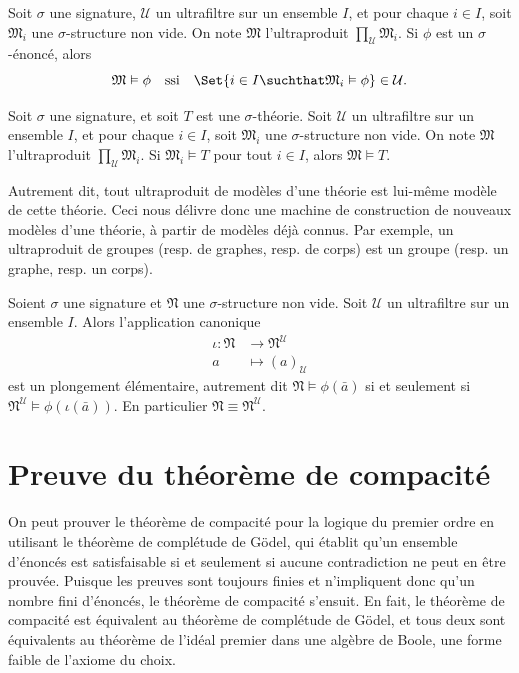 \begin{corollary}\label{cor.Los-enonce}
	Soit $\sigma$ une signature, $\mathcal{U}$ un ultrafiltre sur un ensemble $I$, et pour chaque $i\in I$, soit $\mathfrak{M}_{i}$ une $\sigma$-structure non vide. On note $\mathfrak{M}$ l'ultraproduit $\prod_{\mathcal{U}}\mathfrak{M}_{i}$. Si $\phi$ est un $\sigma$-énoncé, alors
	\[
		\mathfrak{M}\vDash\phi\quad\text{ssi}\quad\Set{i\in I\suchthat\mathfrak{M}_{i}\vDash\phi}\in\mathcal{U}.
	\]
\end{corollary}

\begin{corollary}
	Soit $\sigma$ une signature, et soit $T$ est une $\sigma$-théorie. Soit $\mathcal{U}$ un ultrafiltre sur un ensemble $I$, et pour chaque $i\in I$, soit $\mathfrak{M}_{i}$ une $\sigma$-structure non vide. On note $\mathfrak{M}$ l'ultraproduit $\prod_{\mathcal{U}}\mathfrak{M}_{i}$. Si $\mathfrak{M}_{i}\vDash T$ pour tout $i\in I$, alors $\mathfrak{M}\vDash T$.
\end{corollary}

Autrement dit, tout ultraproduit de modèles d'une théorie est lui-même modèle de cette théorie. Ceci nous délivre donc une machine de construction de nouveaux modèles d'une théorie, à partir de modèles déjà connus. Par exemple, un ultraproduit de groupes (resp. de graphes, resp. de corps) est un groupe (resp. un graphe, resp. un corps).

\begin{corollary}
	Soient $\sigma$ une signature et $\mathfrak{N}$ une $\sigma$-structure non vide. Soit $\mathcal{U}$ un ultrafiltre sur un ensemble $I$. Alors l'application canonique
	\begin{align*}
		\iota\colon\mathfrak{N}&\longrightarrow\mathfrak{N}^{\mathcal{U}}\\
		a&\longmapsto(a)_{\mathcal{U}}
	\end{align*}
	est un plongement élémentaire, autrement dit $\mathfrak{N}\vDash\phi\left(\bar{a}\right)$ si et seulement si $\mathfrak{N}^{\mathcal{U}}\vDash\phi\left(\iota\left(\bar{a}\right)\right)$. En particulier $\mathfrak{N}\equiv\mathfrak{N}^{\mathcal{U}}$.
\end{corollary}



\section{Preuve du théorème de compacité}

On peut prouver le théorème de compacité pour la logique du premier ordre en utilisant le théorème de complétude de Gödel, qui établit qu'un ensemble d'énoncés est satisfaisable si et seulement si aucune contradiction ne peut en être prouvée. Puisque les preuves sont toujours finies et n'impliquent donc qu'un nombre fini d'énoncés, le théorème de compacité s'ensuit. En fait, le théorème de compacité est équivalent au théorème de complétude de Gödel, et tous deux sont équivalents au théorème de l'idéal premier dans une algèbre de Boole, une forme faible de l'axiome du choix.

